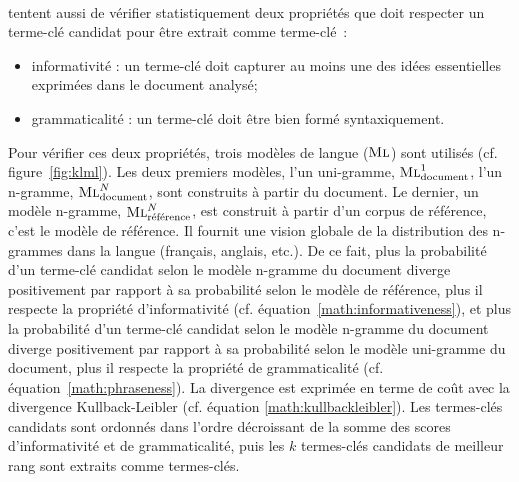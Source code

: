         ~\\ tentent aussi de vérifier
        statistiquement deux propriétés que doit respecter un terme-clé candidat
        pour être extrait comme terme-clé~:
        \begin{itemize}
          \item{informativité : un terme-clé doit capturer au moins une des
                idées essentielles exprimées dans le document analysé;}
          \item{grammaticalité : un terme-clé doit être bien formé
                syntaxiquement.}
        \end{itemize}
        Pour vérifier ces deux propriétés, trois modèles de langue
        ($\textsc{Ml}$) sont utilisés (cf. figure~\ref{fig:klml}). Les deux
        premiers modèles, l'un uni-gramme, $\textsc{Ml}_{\text{document}}^1$,
        l'un n-gramme, $\textsc{Ml}_{\text{document}}^N$, sont construits à
        partir du document. Le dernier, un modèle n-gramme,
        $\textsc{Ml}_{\text{référence}}^N$, est construit à partir d'un corpus
        de référence, c'est le modèle de référence. Il fournit une vision
        globale de la distribution des n-grammes dans la langue (français,
        anglais, etc.). De ce fait, plus la probabilité d'un terme-clé candidat
        selon le modèle n-gramme du document diverge positivement par rapport à
        sa probabilité selon le modèle de référence, plus il respecte la
        propriété d'informativité (cf. équation~\ref{math:informativeness}), et
        plus la probabilité d'un terme-clé candidat selon le modèle n-gramme du
        document diverge positivement par rapport à sa probabilité selon le
        modèle uni-gramme du document, plus il respecte la propriété de
        grammaticalité (cf. équation~\ref{math:phraseness}). La divergence est
        exprimée en terme de coût avec la divergence Kullback-Leibler (cf.
        équation \ref{math:kullbackleibler}). Les termes-clés candidats sont
        ordonnés dans l'ordre décroissant de la somme des scores d'informativité
        et de grammaticalité, puis les $k$ termes-clés candidats de meilleur
        rang sont extraits comme termes-clés.
